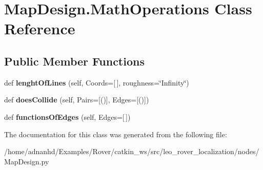 \hypertarget{classMapDesign_1_1MathOperations}{}\section{Map\+Design.\+Math\+Operations Class Reference}
\label{classMapDesign_1_1MathOperations}
\subsection*{Public Member Functions}
\begin{DoxyCompactItemize}
\item 
\mbox{\label{classMapDesign_1_1MathOperations_a17956efa84f9873b11a8ec0a45b46929}} 
def {\bfseries lenght\+Of\+Lines} (self, Coords=\mbox{[}$\,$\mbox{]}, roughness=\char`\"{}Infinity\char`\"{})
\item 
\mbox{\label{classMapDesign_1_1MathOperations_acf2148fd6440dbefab6fb5f8ed4d96eb}} 
def {\bfseries does\+Collide} (self, Pairs=\mbox{[}()\mbox{]}, Edges=\mbox{[}()\mbox{]})
\item 
\mbox{\label{classMapDesign_1_1MathOperations_a764a8e6e93168ed3eb288fafb64e2ab5}} 
def {\bfseries functions\+Of\+Edges} (self, Edges=\mbox{[}$\,$\mbox{]})
\end{DoxyCompactItemize}


The documentation for this class was generated from the following file\+:\begin{DoxyCompactItemize}
\item 
/home/adnanhd/\+Examples/\+Rover/catkin\+\_\+ws/src/leo\+\_\+rover\+\_\+localization/nodes/Map\+Design.\+py\end{DoxyCompactItemize}
